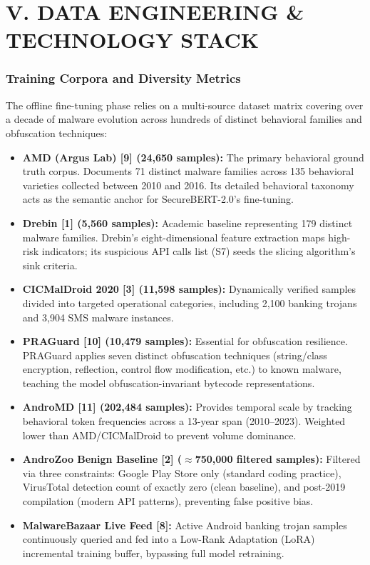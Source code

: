 \documentclass[10pt,a4paper]{article}
\begin{document}
\section{V. DATA ENGINEERING \& TECHNOLOGY STACK}

\subsubsection*{Training Corpora and Diversity Metrics}

The offline fine-tuning phase relies on a multi-source dataset matrix covering over a decade of malware evolution across hundreds of distinct behavioral families and obfuscation techniques:
\begin{itemize}
  \item \textbf{AMD (Argus Lab) [9] (24,650 samples):} The primary behavioral ground truth corpus. Documents 71 distinct malware families across 135 behavioral varieties collected between 2010 and 2016. Its detailed behavioral taxonomy acts as the semantic anchor for SecureBERT-2.0's fine-tuning.
  \item \textbf{Drebin [1] (5,560 samples):} Academic baseline representing 179 distinct malware families. Drebin's eight-dimensional feature extraction maps high-risk indicators; its suspicious API calls list (S7) seeds the slicing algorithm's sink criteria.
  \item \textbf{CICMalDroid 2020 [3] (11,598 samples):} Dynamically verified samples divided into targeted operational categories, including 2,100 banking trojans and 3,904 SMS malware instances.
  \item \textbf{PRAGuard [10] (10,479 samples):} Essential for obfuscation resilience. PRAGuard applies seven distinct obfuscation techniques (string/class encryption, reflection, control flow modification, etc.) to known malware, teaching the model obfuscation-invariant bytecode representations.
  \item \textbf{AndroMD [11] (202,484 samples):} Provides temporal scale by tracking behavioral token frequencies across a 13-year span (2010--2023). Weighted lower than AMD/CICMalDroid to prevent volume dominance.
  \item \textbf{AndroZoo Benign Baseline [2] ($\approx$750,000 filtered samples):} Filtered via three constraints: Google Play Store only (standard coding practice), VirusTotal detection count of exactly zero (clean baseline), and post-2019 compilation (modern API patterns), preventing false positive bias.
  \item \textbf{MalwareBazaar Live Feed [8]:} Active Android banking trojan samples continuously queried and fed into a Low-Rank Adaptation (LoRA) incremental training buffer, bypassing full model retraining.
\end{itemize}
\end{document}

